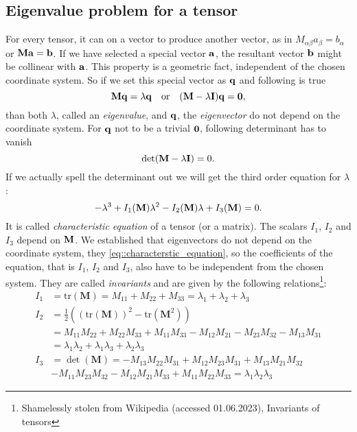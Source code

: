 \documentclass[justified, nobib]{tufte-handout}
\begin{document}
\subsection{Eigenvalue problem for a tensor}
For every tensor, it can  on a vector to produce another vector, as
in \(M_{\alpha\beta}a_\beta = b_\alpha\) or \(\vb{M}\vb{a} = \vb{b}\). If we
have selected a special vector \(\vb{a}\), the resultant vector \(\vb{b}\)
might be collinear with \(\vb{a}\). This property is a geometric fact,
independent of the chosen coordinate system. So if we set this special
vector as \(\vb{q}\) and following is true
\[
	\vb{M}\vb{q} = \lambda\vb{q} \quad \text{or} \quad
	\qty(\vb{M} - \lambda\vb{I})\vb{q} = \vb{0},
\]
than both \(\lambda\), called an \emph{eigenvalue}, and \(\vb{q}\), the
\emph{eigenvector} do not depend on the coordinate system.
For \(\vb{q}\) not to be a trivial \(\vb{0}\), following determinant has to
vanish
\[
	\det(\vb{M} - \lambda\vb{I}) = 0.
\]
If we actually spell the determinant out we will get the third order
equation for \(\lambda\):
\begin{equation}\label{eq::characterstic_equation}
	-\lambda^3 + I_1 \qty(\vb{M})\lambda^2 - I_2\qty(\vb{M})\lambda
	+ I_3\qty(\vb{M}) = 0.
\end{equation}
It is called \emph{characteristic equation} of a tensor (or a matrix). The
scalars \(I_1\), \(I_2\) and \(I_3\) depend on \(\vb{M}\). We established
that eigenvectors do not depend on the coordinate system, they 
\autoref{eq::characterstic_equation}, so the coefficients of the equation,
that is \(I_1\), \(I_2\) and \(I_3\), also have to be independent from the
chosen system. They are called \emph{invariants} and are given by the
following relations\footnote{Shamelessly stolen from Wikipedia (accessed
	01.06.2023), Invariants of tensors}:
\begin{align*}
	I_1 & = \mathrm{tr}(\mathbf{M}) = M_{11}+M_{22}+M_{33} = \lambda_1+\lambda_2+\lambda_3                       \\
	I_2 & = \frac{1}{2} \left( (\mathrm{tr}(\mathbf{M}))^2-\mathrm{tr} \left( \mathbf{M}^2 \right) \right)       \\
	    & = M_{11}M_{22}+M_{22}M_{33}+M_{11}M_{33}-M_{12}M_{21}-M_{23}M_{32}-M_{13}M_{31}                        \\
	    & = \lambda_1 \lambda_2 + \lambda_1 \lambda_3 + \lambda_2 \lambda_3                                      \\
	I_3 & = \det (\mathbf{M}) = -M_{13} M_{22} M_{31} + M_{12} M_{23} M_{31} + M_{13} M_{21} M_{32}              \\
	    & - M_{11} M_{23} M_{32} - M_{12} M_{21} M_{33} +   M_{11} M_{22} M_{33} = \lambda_1 \lambda_2 \lambda_3
\end{align*}
\end{document}
